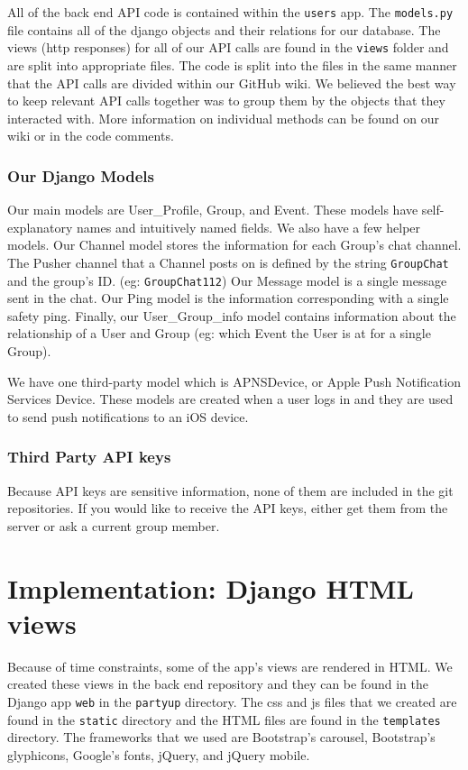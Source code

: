 \documentclass[12pt]{article}
\begin{document}
All of the back end API code is contained within the \texttt{users} app.
The \texttt{models.py} file contains all of the django objects and their relations for our database. 
The views (http responses) for all of our API calls are found in the \texttt{views} folder and are split into appropriate files.
The code is split into the files in the same manner that the API calls are divided within our GitHub wiki. 
We believed the best way to keep relevant API calls together was to group them by the objects that they interacted with. 
More information on individual methods can be found on our wiki or in the code comments.

\subsubsection{Our Django Models}

Our main models are User\_Profile, Group, and Event. 
These models have self-explanatory names and intuitively named fields. 
We also have a few helper models. 
Our Channel model stores the information for each Group's chat channel. 
The Pusher channel that a Channel posts on is defined by the string \texttt{GroupChat} and the group's ID. (eg: \texttt{GroupChat112}) 
Our Message model is a single message sent in the chat. 
Our Ping model is the information corresponding with a single safety ping. 
Finally, our User\_Group\_info model contains information about the relationship of a User and Group (eg: which Event the User is at for a single Group).

We have one third-party model which is APNSDevice, or Apple Push Notification Services Device. 
These models are created when a user logs in and they are used to send push notifications to an iOS device.

\subsubsection{Third Party API keys}

Because API keys are sensitive information, none of them are included in the git repositories. 
If you would like to receive the API keys, either get them from the server or ask a current group member.

\section{Implementation: Django HTML views}

Because of time constraints, some of the app's views are rendered in HTML. We created these views in the back end repository and they can be found in the Django app \texttt{web} in the \texttt{partyup} directory. The css and js files that we created are found in the  \texttt{static} directory and the HTML files are found in the  \texttt{templates} directory. The frameworks that we used are Bootstrap's carousel, Bootstrap's glyphicons, Google's fonts, jQuery, and jQuery mobile. 
\end{document}
